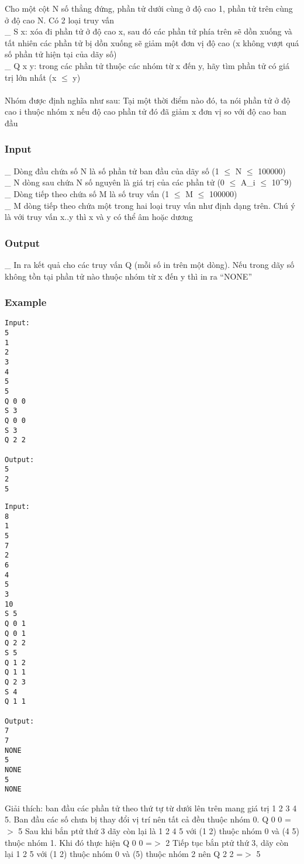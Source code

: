 



   Cho một cột N số thẳng đứng, phần tử dưới cùng ở độ cao 1, phần tử trên cùng ở độ cao N. Có 2 loại truy vấn   
\\   \_ S x: xóa đi phần tử ở độ cao x, sau đó các phần tử phía trên sẽ dồn xuống và tất nhiên các phần tử bị dồn xuống sẽ giảm một đơn vị độ cao (x không vượt quá số phần tử hiện tại của dãy số)   
\\   \_ Q x y: trong các phần tử thuộc các nhóm từ x đến y, hãy tìm phần tử có giá trị lớn nhất (x $\le$ y)   
\\
\\   Nhóm được định nghĩa như sau: Tại một thời điểm nào đó, ta nói phần tử ở độ cao i thuộc nhóm x nếu độ cao phần tử đó đã giảm x đơn vị so với độ cao ban đầu  

\subsubsection{   Input  }

   \_ Dòng đầu chứa số N là số phần tử ban đầu của dãy số (1 $\le$ N $\le$ 100000)   
\\   \_ N dòng sau chứa N số nguyên là giá trị của các phần tử (0 $\le$ A\_i $\le$ 10\textasciicircum9)   
\\   \_ Dòng tiếp theo chứa số M là số truy vấn (1 $\le$ M $\le$ 100000)   
\\   \_ M dòng tiếp theo chứa một trong hai loại truy vấn như định dạng trên. Chú ý là với truy vấn x..y thì x và y có thể âm hoặc dương   
\\

\subsubsection{   Output  }

   \_ In ra kết quả cho các truy vấn Q (mỗi số in trên một dòng). Nếu trong dãy số không tồn tại phần tử nào thuộc nhóm từ x đến y thì in ra “NONE”  

\subsubsection{   Example  }
\begin{verbatim}
Input:
5
1
2
3
4
5
5
Q 0 0
S 3
Q 0 0
S 3
Q 2 2

Output:
5
2
5
\end{verbatim}
\begin{verbatim}
Input:
8
1
5
7
2
6
4
5
3
10
S 5
Q 0 1
Q 0 1
Q 2 2
S 5
Q 1 2
Q 1 1
Q 2 3
S 4
Q 1 1

Output:
7
7
NONE
5
NONE
5
NONE
\end{verbatim}

   Giải thích: ban đầu các phần tử theo thứ tự từ dưới lên trên mang giá trị 1 2 3 4 5. Ban đầu các số chưa bị thay đổi vị trí nên tất cả đều thuộc nhóm 0. Q 0 0 =$>$ 5 Sau khi bắn ptử thứ 3 dãy còn lại là 1 2 4 5 với (1 2) thuộc nhóm 0 và (4 5) thuộc nhóm 1. Khi đó thực hiện Q 0 0 =$>$ 2 Tiếp tục bắn ptử thứ 3, dãy còn lại 1 2 5 với (1 2) thuộc nhóm 0 và (5) thuộc nhóm 2 nên Q 2 2 =$>$ 5  
